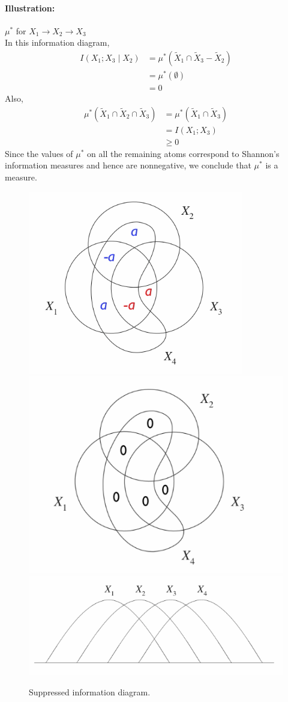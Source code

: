 \documentclass[8pt]{article}
\begin{document}
\paragraph{Illustration:} $\mu^{*}$ for $X_{1} \rightarrow X_{2} \rightarrow X_{3}$\\
In this information diagram,
$$
\begin{aligned}
I\left(X_{1} ; X_{3} \mid X_{2}\right) &=\mu^{*}\left(\tilde{X}_{1} \cap \tilde{X}_{3}-\tilde{X}_{2}\right) \\
&=\mu^{*}(\emptyset) \\
&=0
\end{aligned}
$$
Also,
$$
\begin{aligned}
\mu^{*}\left(\tilde{X}_{1} \cap \tilde{X}_{2} \cap \tilde{X}_{3}\right) &=\mu^{*}\left(\tilde{X}_{1} \cap \tilde{X}_{3}\right) \\
&=I\left(X_{1} ; X_{3}\right) \\
& \geq 0
\end{aligned}
$$
Since the values of $\mu^{*}$ on all the remaining atoms correspond to Shannon's information measures and hence are nonnegative, we conclude that $\mu^{*}$ is a measure.

\begin{figure}[!h]
    \centering
    \includegraphics[width=0.28\linewidth]{imgs/exp3_4_5.png}
    \includegraphics[width=0.3\linewidth]{imgs/exp3_4_3.png} \qquad
    \includegraphics[width=0.35\linewidth]{imgs/exp3_4_4.png}
    \caption{Suppressed information diagram.}
    \label{fig:my_label}
\end{figure}
\end{document}
